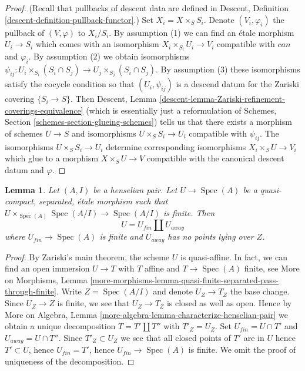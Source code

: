 \documentclass{stacks-project}
\theoremstyle{plain}
\newtheorem{lemma}[subsection]{Lemma}
\theoremstyle{definition}
\theoremstyle{remark}
\numberwithin{equation}{subsection}
\def\Spec{\mathop{\mathrm{Spec}}}
\begin{document}
\begin{proof}
(Recall that pullbacks of descent data are defined in
Descent, Definition \ref{descent-definition-pullback-functor}.)
Set $X_i = X \times_S S_i$. Denote $(V_i, \varphi_i)$ the pullback
of $(V, \varphi)$ to $X_i/S_i$.
By assumption (1) we can find an \'etale morphism $U_i \to S_i$
which comes with an isomorphism $X_i \times_{S_i} U_i \to V_i$ compatible with
$can$ and $\varphi_i$. By assumption (2) we obtain isomorphisms
$\psi_{ij} : U_i \times_{S_i} (S_i \cap S_j) \to
U_j \times_{S_j} (S_i \cap S_j)$.
By assumption (3) these isomorphisms satisfy the cocycle condition
so that $(U_i, \psi_{ij})$ is a descend datum for the
Zariski covering $\{S_i \to S\}$. Then Descent, Lemma
\ref{descent-lemma-Zariski-refinement-coverings-equivalence}
(which is essentially just a reformulation of
Schemes, Section \ref{schemes-section-glueing-schemes})
tells us that there exists a morphism of schemes $U \to S$
and isomorphisms $U \times_S S_i \to U_i$ compatible
with $\psi_{ij}$. The isomorphisms $U \times_S S_i \to U_i$
determine corresponding isomorphisms $X_i \times_S U \to V_i$
which glue to a morphism $X \times_S U \to V$ compatible
with the canonical descent datum and $\varphi$.
\end{proof}

\begin{lemma}
\label{lemma-split-henselian}
Let $(A, I)$ be a henselian pair. Let $U \to \Spec(A)$ be a
quasi-compact, separated, \'etale morphism such that
$U \times_{\Spec(A)} \Spec(A/I) \to \Spec(A/I)$ is finite.
Then
$$
U = U_{fin} \amalg U_{away}
$$
where $U_{fin} \to \Spec(A)$ is finite and $U_{away}$ has
no points lying over $Z$.
\end{lemma}

\begin{proof}
By Zariski's main theorem, the scheme $U$ is quasi-affine.
In fact, we can find an open immersion $U \to T$ with $T$ affine and
$T \to \Spec(A)$ finite, see More on Morphisms, Lemma
\ref{more-morphisms-lemma-quasi-finite-separated-pass-through-finite}.
Write $Z = \Spec(A/I)$ and denote $U_Z \to T_Z$ the base change.
Since $U_Z \to Z$ is finite, we see that $U_Z \to T_Z$ is closed
as well as open. Hence by
More on Algebra, Lemma \ref{more-algebra-lemma-characterize-henselian-pair}
we obtain a unique decomposition $T = T' \amalg T''$ with $T'_Z = U_Z$.
Set $U_{fin} = U \cap T'$ and $U_{away} = U \cap T''$. Since
$T'_Z \subset U_Z$ we see that all closed points of $T'$ are in $U$
hence $T' \subset U$, hence $U_{fin} = T'$, hence $U_{fin} \to \Spec(A)$
is finite. We omit the proof
of uniqueness of the decomposition.
\end{proof}
\end{document}
